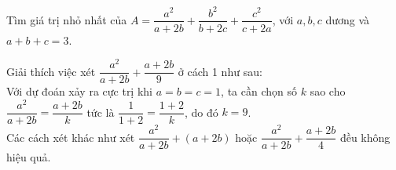 \begin{vd}
	Tìm giá trị nhỏ nhất của $A=\dfrac{a^2}{a+2b}+\dfrac{b^2}{b+2c}+\dfrac{c^2}{c+2a}$, với $a, b, c$ dương và $a+b+c=3$.
\end{vd}
\begin{note}
	Giải thích  việc xét $\dfrac{a^2}{a+2b}+\dfrac{a+2b}{9}$ ở cách 1 như sau:\\
	Với dự đoán xảy ra cực trị khi $a=b=c=1$, ta cần chọn số $k$ sao cho 
	$\dfrac{a^2}{a+2b}=\dfrac{a+2b}{k}$ tức là $\dfrac{1}{1+2}=\dfrac{1+2}{k}$, do đó $k=9$.\\
	Các cách xét khác như xét $\dfrac{a^2}{a+2b}+(a+2b)$ hoặc $\dfrac{a^2}{a+2b}+\dfrac{a+2b}{4}$ đều không hiệu quả.
\end{note}
